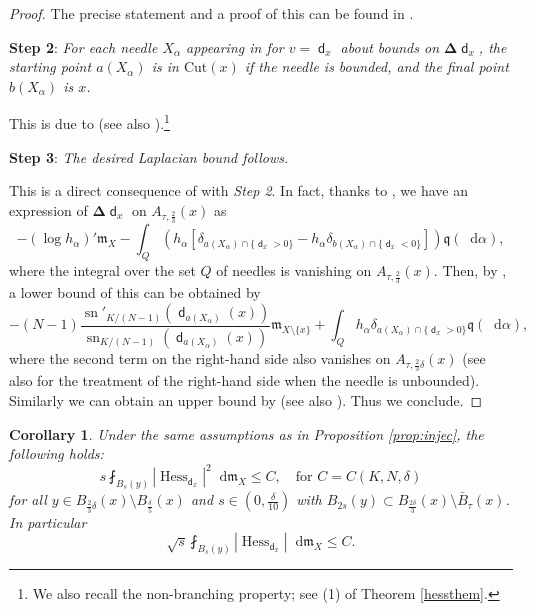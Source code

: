 \documentclass[11pt,reqno]{amsart}
\newtheorem{corollary}[theorem]{Corollary}
\theoremstyle{definition}
\numberwithin{equation}{section}
\newcommand{\di}{\mathop{}\!\mathrm{d}}
\newcommand{\meas}{\mathfrak{m}}
\DeclareMathOperator{\dist}{\mathsf{d}}
\DeclareMathOperator{\Hess}{Hess}
\DeclareMathOperator{\sn}{sn}
\begin{document}
\begin{proof}
\smallskip 

The precise statement and a proof of this can be found in \cite[Corollary 4.19]{CM}.


\smallskip 

\textbf{Step 2}: \textit{For each needle $X_{\alpha}$ appearing in \cite[subsection 4.3]{CM} for $v=\dist_x$ about bounds on $\boldsymbol{\Delta} \dist_x$, the starting point $a(X_{\alpha})$ is in $\mathrm{Cut}(x)$ if the needle is bounded, and the final point $b(X_{\alpha})$ is $x$.}

\medskip 


This is due to \cite[Remarks 4.12 and 5.2]{CM} (see also \cite[Remark 4.9]{CM}).\footnote{We also recall the non-branching property; see (1) of Theorem \ref{hessthem}.}

\medskip 

\textbf{Step 3}: \textit{The desired Laplacian bound follows.}


\medskip 



This is a direct consequence of \cite[(2) of Corollary 4.16]{CM} with \textit{Step 2}. In fact, thanks to \cite[(4.33)]{CM}, we have an expression of $\boldsymbol{\Delta} \dist_x$ on $A_{\tau, \frac{2}{3}} (x)$ as 
\begin{equation}
    -(\log h_{\alpha})'\meas_X-\int_Q\left(h_{\alpha}[\delta_{a(X_{\alpha})\cap\{\dist_x>0\}}-h_{\alpha}\delta_{b(X_{\alpha})\cap\{\dist_x<0\}}]\right)\mathfrak{q}(\di \alpha),
\end{equation}
where the integral over the set $Q$ of needles  is vanishing on $A_{\tau, \frac{2}{3}} (x)$.
Then, by \cite[(4.35)]{CM}, a lower bound of this can be obtained by
\begin{equation}
    -(N-1)\frac{\sn'_{K/(N-1)}(\dist_{a(X_{\alpha})}(x))}{\sn_{K/(N-1)}(\dist_{a(X_{\alpha})}(x))}\meas_{X\setminus \{x\}}+\int_Qh_{\alpha}\delta_{a(X_{\alpha})\cap\{\dist_x>0\}}\mathfrak{q}(\di \alpha),
\end{equation}
where the second term on the right-hand side also vanishes on $A_{\tau, \frac{2}{3}\delta} (x)$ (see also \cite[Lemma 4.13]{CM} for the treatment of the right-hand side when the needle is unbounded).
Similarly we can obtain an upper bound by \cite[(4.34)]{CM} (see also \cite{Gigli}). Thus we conclude.
\end{proof}
\begin{corollary}\label{cor:distancehess}
Under the same assumptions as in Proposition \ref{prop:injec}, the following holds: 
\begin{equation}\label{asaiasas8s8}
s\fint_{B_s(y)}|\Hess_{\dist_x}|^2\di \meas_X \le C,\quad \text{for $C = C(K, N, \delta)$} 
\end{equation}
for all  $y \in B_{\frac{2}{3}\delta}(x)\setminus B_{\frac{\delta}{5}}(x)$ and $s \in \left(0, \frac{\delta}{10}\right)$ with $B_{2s}(y)\subset B_{\frac{2\delta}{3}}(x) \setminus \bar B_{\tau}(x)$.
In particular
\begin{equation}\label{eq:distancehessian}
\sqrt{s}\fint_{B_s(y)}|\Hess_{\dist_x}|\di \meas_X \le C.
\end{equation}
\end{corollary}
\end{document}
